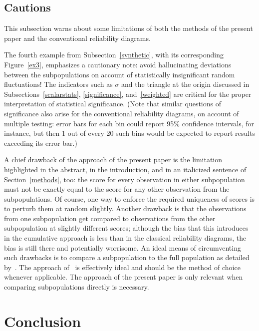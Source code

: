 \documentclass{article}
\begin{document}
\subsection{Cautions}
\label{caution}

This subsection warns about some limitations of both the methods
of the present paper and the conventional reliability diagrams.

The fourth example from Subsection~\ref{synthetic},
with its corresponding Figure~\ref{ex3}, emphasizes a cautionary note:
avoid hallucinating deviations between the subpopulations
on account of statistically insignificant random fluctuations!
The indicators such as $\sigma$ and the triangle at the origin
discussed in Subsections~\ref{scalarstats},
\ref{significance}, and~\ref{weighted} are critical
for the proper interpretation of statistical significance.
(Note that similar questions of significance also arise
for the conventional reliability diagrams, on account of multiple testing:
error bars for each bin could report 95\% confidence intervals, for instance,
but then 1 out of every 20 such bins would be expected to report results
exceeding its error bar.)

A chief drawback of the approach of the present paper
is the limitation highlighted in the abstract, in the introduction,
and in an italicized sentence of Section~\ref{methods}, too:
the score for every observation in either subpopulation
must not be exactly equal to the score for any other observation
from the subpopulations. Of course, one way to enforce the required uniqueness
of scores is to perturb them at random slightly.
Another drawback is that the observations
from one subpopulation get compared to observations
from the other subpopulation at slightly different scores;
although the bias that this introduces in the cumulative approach
is less than in the classical reliability diagrams, the bias is still there
and potentially worrisome.
An ideal means of circumventing such drawbacks is to compare
a subpopulation to the full population as detailed by~\cite{tygert}.
The approach of~\cite{tygert} is effectively ideal
and should be the method of choice whenever applicable.
The approach of the present paper is only relevant
when comparing subpopulations directly is necessary.



\section{Conclusion}
\label{conclusion}
\end{document}

